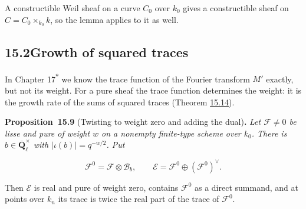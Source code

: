 \documentclass[11pt]{article}
\newenvironment{bpstatement}[2]{\par\addvspace{0.6\baselineskip}\noindent\textbf{#1}#2\textbf{.}\enspace\ignorespaces}
  {\par\addvspace{0.4\baselineskip}}
\newenvironment{bpstatementit}[2]{\begin{bpstatement}{#1}{#2}\itshape\ignorespaces}{\end{bpstatement}}
\newcommand{\bpout}[1]{#1\textsuperscript{\hyperlink{bp-outside}{\ensuremath{\ast}}}}
\begin{document}
\label{bp24}%
A constructible Weil sheaf on a curve \(C_0\) over \(k_0\) gives a constructible sheaf on \(C=C_0\times_{k_0}k\), so the lemma applies to it as well.


\subsection*{\texorpdfstring{15.2\quad Growth of squared traces}{15.2 Growth of squared traces}}
\label{bp25}%
\label{bp26}%
In Chapter \bpout{17} we know the trace function of the Fourier transform \(M'\) exactly, but not its weight. For a pure sheaf the trace function determines the weight: it is the growth rate of the sums of squared traces (Theorem \hyperref[bp41]{15.14}).

\label{bp27}%
\begin{bpstatementit}{Proposition~15.9}{ (Twisting to weight zero and adding the dual)}
Let \(\mathcal F\ne0\) be lisse and pure of weight \(w\) on a nonempty finite-type scheme over \(k_0\).  There is \(b\in\overline{\mathbf Q}_\ell^\times\) with \(|\iota(b)|=q^{-w/2}\).  Put

\[
\mathcal F^0=\mathcal F\otimes\mathcal B_b,
\qquad \mathcal E=\mathcal F^0\oplus(\mathcal F^0)^\vee.
\]

Then \(\mathcal E\) is real and pure of weight zero, contains \(\mathcal F^0\) as a direct summand, and at points over \(k_n\) its trace is twice the real part of the trace of \(\mathcal F^0\).
\end{bpstatementit}
\end{document}
